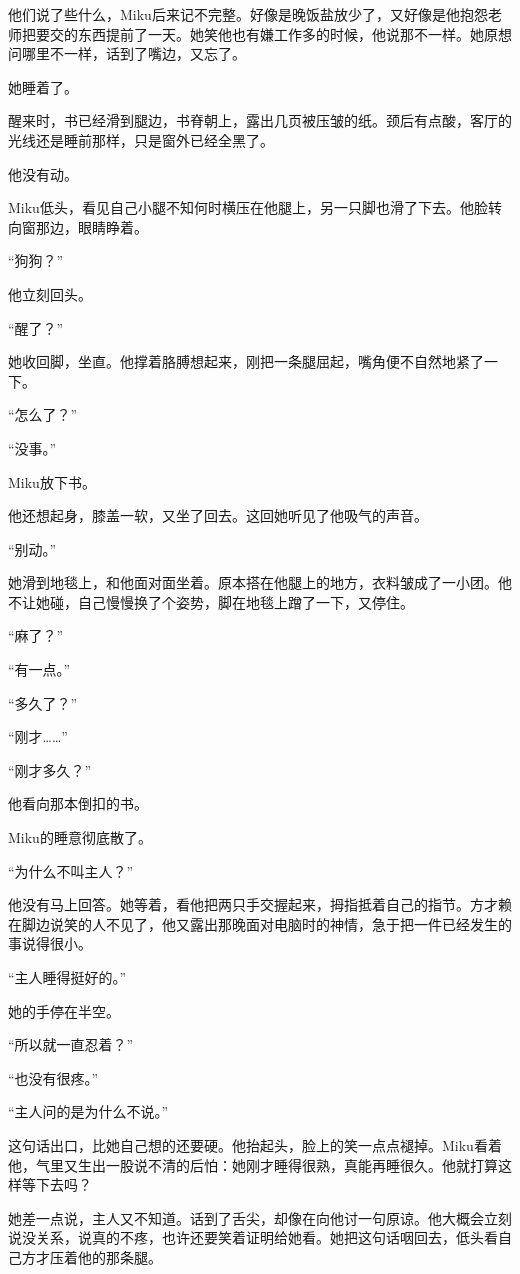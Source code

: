 他们说了些什么，Miku后来记不完整。好像是晚饭盐放少了，又好像是他抱怨老师把要交的东西提前了一天。她笑他也有嫌工作多的时候，他说那不一样。她原想问哪里不一样，话到了嘴边，又忘了。

她睡着了。

醒来时，书已经滑到腿边，书脊朝上，露出几页被压皱的纸。颈后有点酸，客厅的光线还是睡前那样，只是窗外已经全黑了。

他没有动。

Miku低头，看见自己小腿不知何时横压在他腿上，另一只脚也滑了下去。他脸转向窗那边，眼睛睁着。

“狗狗？”

他立刻回头。

“醒了？”

她收回脚，坐直。他撑着胳膊想起来，刚把一条腿屈起，嘴角便不自然地紧了一下。

“怎么了？”

“没事。”

Miku放下书。

他还想起身，膝盖一软，又坐了回去。这回她听见了他吸气的声音。

“别动。”

她滑到地毯上，和他面对面坐着。原本搭在他腿上的地方，衣料皱成了一小团。他不让她碰，自己慢慢换了个姿势，脚在地毯上蹭了一下，又停住。

“麻了？”

“有一点。”

“多久了？”

“刚才……”

“刚才多久？”

他看向那本倒扣的书。

Miku的睡意彻底散了。

“为什么不叫主人？”

他没有马上回答。她等着，看他把两只手交握起来，拇指抵着自己的指节。方才赖在脚边说笑的人不见了，他又露出那晚面对电脑时的神情，急于把一件已经发生的事说得很小。

“主人睡得挺好的。”

她的手停在半空。

“所以就一直忍着？”

“也没有很疼。”

“主人问的是为什么不说。”

这句话出口，比她自己想的还要硬。他抬起头，脸上的笑一点点褪掉。Miku看着他，气里又生出一股说不清的后怕：她刚才睡得很熟，真能再睡很久。他就打算这样等下去吗？

她差一点说，主人又不知道。话到了舌尖，却像在向他讨一句原谅。他大概会立刻说没关系，说真的不疼，也许还要笑着证明给她看。她把这句话咽回去，低头看自己方才压着他的那条腿。


